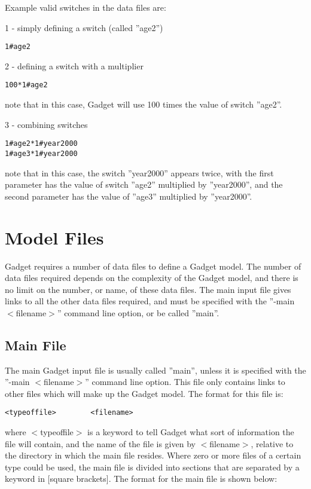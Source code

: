 \documentclass [a4paper, 10pt]{book}
\begin{document}
\bigskip
Example valid switches in the data files are:\newline

1 - simply defining a switch (called ''age2'')
{\small\begin{verbatim}
1#age2
\end{verbatim}}

2 - defining a switch with a multiplier
{\small\begin{verbatim}
100*1#age2
\end{verbatim}}
note that in this case, Gadget will use 100 times the value of switch ''age2''.\newline

3 - combining switches
{\small\begin{verbatim}
1#age2*1#year2000
1#age3*1#year2000
\end{verbatim}}
note that in this case, the switch ''year2000'' appears twice, with the first parameter has the value of switch ''age2'' multiplied by ''year2000'', and the second parameter has the value of ''age3'' multiplied by ''year2000''.

\chapter{Model Files}\label{chap:model}
Gadget requires a number of data files to define a Gadget model.  The number of data files required depends on the complexity of the Gadget model, and there is no limit on the number, or name, of these data files.  The main input file gives links to all the other data files required, and must be specified with the ''-main $<$filename$>$'' command line option, or be called ''main''.

\section{Main File}\label{sec:mainfile}
The main Gadget input file is usually called ''main'', unless it is specified with the ''-main $<$filename$>$'' command line option.  This file only contains links to other files which will make up the Gadget model.  The format for this file is:

{\small\begin{verbatim}
<typeoffile>        <filename>
\end{verbatim}}

where $<$typeoffile$>$ is a keyword to tell Gadget what sort of information the file will contain, and the name of the file is given by $<$filename$>$, relative to the directory in which the main file resides.  Where zero or more files of a certain type could be used, the main file is divided into sections that are separated by a keyword in [square brackets].  The format for the main file is shown below:
\end{document}
